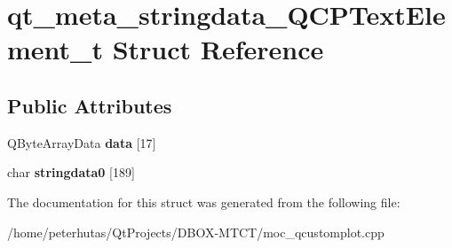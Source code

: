 \hypertarget{structqt__meta__stringdata___q_c_p_text_element__t}{}\section{qt\+\_\+meta\+\_\+stringdata\+\_\+\+Q\+C\+P\+Text\+Element\+\_\+t Struct Reference}
\label{structqt__meta__stringdata___q_c_p_text_element__t}
\subsection*{Public Attributes}
\begin{DoxyCompactItemize}
\item 
\mbox{\label{structqt__meta__stringdata___q_c_p_text_element__t_aea7ed3e03af38c139400f8c837a108bf}} 
Q\+Byte\+Array\+Data {\bfseries data} \mbox{[}17\mbox{]}
\item 
\mbox{\label{structqt__meta__stringdata___q_c_p_text_element__t_a7307363ad48472f7f131b7b59640d43b}} 
char {\bfseries stringdata0} \mbox{[}189\mbox{]}
\end{DoxyCompactItemize}


The documentation for this struct was generated from the following file\+:\begin{DoxyCompactItemize}
\item 
/home/peterhutas/\+Qt\+Projects/\+D\+B\+O\+X-\/\+M\+T\+C\+T/moc\+\_\+qcustomplot.\+cpp\end{DoxyCompactItemize}
